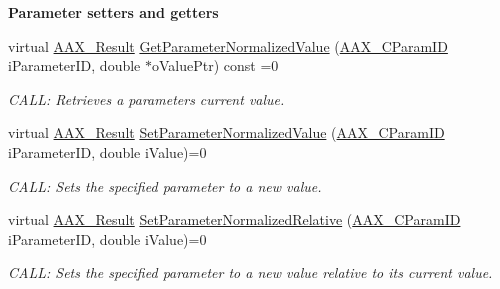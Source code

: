 \begin{Indent}{\bf Parameter setters and getters}
\begin{DoxyCompactItemize}
virtual \hyperlink{a00149_a4d8f69a697df7f70c3a8e9b8ee130d2f}{A\+A\+X\+\_\+\+Result} \hyperlink{a00061_a18e3407bac178a9b0339bd6f95e74a17}{Get\+Parameter\+Normalized\+Value} (\hyperlink{a00149_a1440c756fe5cb158b78193b2fc1780d1}{A\+A\+X\+\_\+\+C\+Param\+I\+D} i\+Parameter\+I\+D, double $\ast$o\+Value\+Ptr) const =0
\begin{DoxyCompactList}\small\item\em C\+A\+L\+L\+: Retrieves a parameter\textquotesingle{}s current value. \end{DoxyCompactList}\item 
virtual \hyperlink{a00149_a4d8f69a697df7f70c3a8e9b8ee130d2f}{A\+A\+X\+\_\+\+Result} \hyperlink{a00061_a368b0f5a761d1eda4c41b420f153a077}{Set\+Parameter\+Normalized\+Value} (\hyperlink{a00149_a1440c756fe5cb158b78193b2fc1780d1}{A\+A\+X\+\_\+\+C\+Param\+I\+D} i\+Parameter\+I\+D, double i\+Value)=0
\begin{DoxyCompactList}\small\item\em C\+A\+L\+L\+: Sets the specified parameter to a new value. \end{DoxyCompactList}\item 
virtual \hyperlink{a00149_a4d8f69a697df7f70c3a8e9b8ee130d2f}{A\+A\+X\+\_\+\+Result} \hyperlink{a00061_a6e28a427a0d7d0c8df69dd5eb88cff6c}{Set\+Parameter\+Normalized\+Relative} (\hyperlink{a00149_a1440c756fe5cb158b78193b2fc1780d1}{A\+A\+X\+\_\+\+C\+Param\+I\+D} i\+Parameter\+I\+D, double i\+Value)=0
\begin{DoxyCompactList}\small\item\em C\+A\+L\+L\+: Sets the specified parameter to a new value relative to its current value. \end{DoxyCompactList}\end{DoxyCompactItemize}
\end{Indent}
